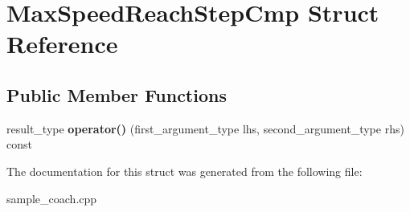 \hypertarget{structMaxSpeedReachStepCmp}{
\section{MaxSpeedReachStepCmp Struct Reference}
\label{structMaxSpeedReachStepCmp}
}
\subsection*{Public Member Functions}
\begin{DoxyCompactItemize}
\item 
\hypertarget{structMaxSpeedReachStepCmp_addf9a97bd1e334b82ae1925123d9bf51}{
result\_\-type {\bfseries operator()} (first\_\-argument\_\-type lhs, second\_\-argument\_\-type rhs) const }
\label{structMaxSpeedReachStepCmp_addf9a97bd1e334b82ae1925123d9bf51}

\end{DoxyCompactItemize}


The documentation for this struct was generated from the following file:\begin{DoxyCompactItemize}
\item 
sample\_\-coach.cpp\end{DoxyCompactItemize}

